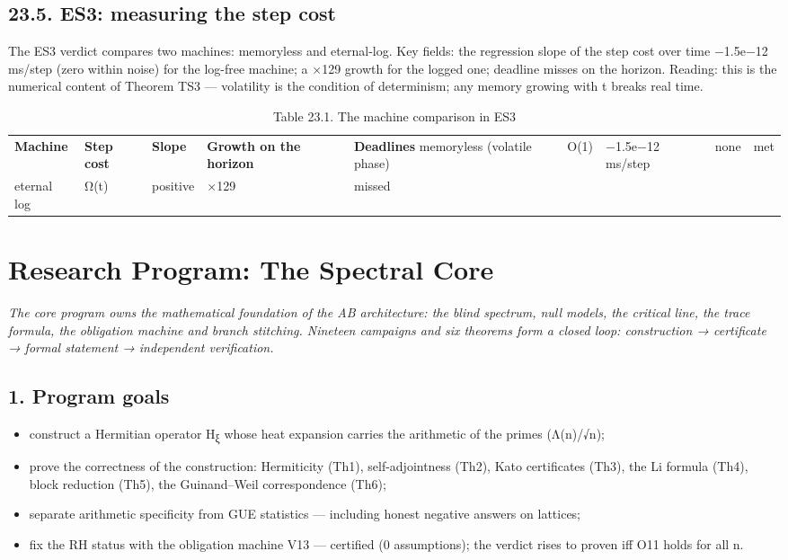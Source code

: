 \documentclass[11pt,a4paper]{article}
\begin{document}
\subsection{23.5. ES3: measuring the step cost}

The ES3 verdict compares two machines: memoryless and eternal-log. Key fields: the regression slope of the step cost over time −1.5e−12 ms/step (zero within noise) for the log-free machine; a ×129 growth for the logged one; deadline misses on the horizon. Reading: this is the numerical content of Theorem TS3 — volatility is the condition of determinism; any memory growing with t breaks real time.

\begin{table}[htbp]\centering\small
\caption{Table 23.1. The machine comparison in ES3}
\begin{tabular}{p{} p{} p{} p{} p{}}
\toprule
\textbf{Machine} & \textbf{Step cost} & \textbf{Slope} & \textbf{Growth on the horizon} & \textbf{Deadlines}
\midrule
memoryless (volatile phase) & O(1) & −1.5e−12 ms/step & none & met \\
eternal log & Ω(t) & positive & ×129 & missed \\
\bottomrule
\end{tabular}
\end{table}

\section{Research Program: The Spectral Core}

\noindent\textit{\color{copper}The core program owns the mathematical foundation of the AB architecture: the blind spectrum, null models, the critical line, the trace formula, the obligation machine and branch stitching. Nineteen campaigns and six theorems form a closed loop: construction → certificate → formal statement → independent verification.}

\subsection{1. Program goals}

\begin{itemize}
  \item construct a Hermitian operator H\textsubscript{ξ} whose heat expansion carries the arithmetic of the primes (Λ(n)/√n);
  \item prove the correctness of the construction: Hermiticity (Th1), self-adjointness (Th2), Kato certificates (Th3), the Li formula (Th4), block reduction (Th5), the Guinand–Weil correspondence (Th6);
  \item separate arithmetic specificity from GUE statistics — including honest negative answers on lattices;
  \item fix the RH status with the obligation machine V13 — certified (0 assumptions); the verdict rises to proven iff O11 holds for all n.
\end{itemize}
\end{document}

